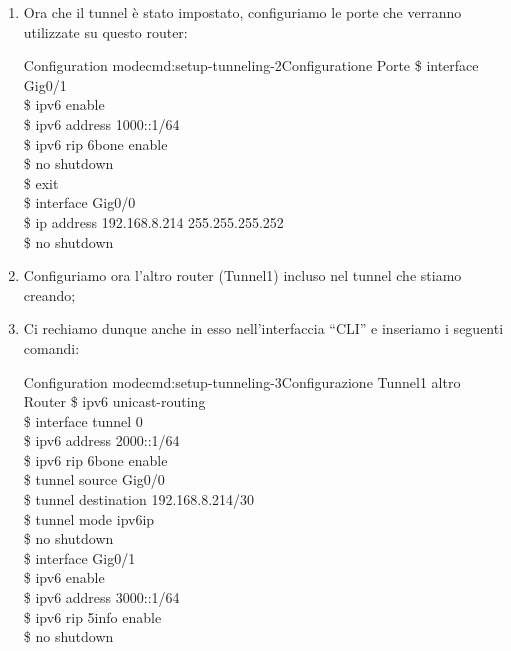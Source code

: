 \begin{enumerate}
\begin{cmds}{Configuration mode}{cmd:setup-tunneling-1}{Configurazione Tunneling}
        \$ tunnel destination 192.168.8.218/30\\
        \$ tunnel mode ipv6ip\\
        \$ no shutdown
    \end{cmds}
    \item Ora che il tunnel è stato impostato, configuriamo le porte che verranno utilizzate su questo router:\par
    \begin{cmds}{Configuration mode}{cmd:setup-tunneling-2}{Configuratione Porte}
        \$ interface Gig0/1\\
        \$ ipv6 enable\\
        \$ ipv6 address 1000::1/64\\
        \$ ipv6 rip 6bone enable\\
        \$ no shutdown\\
        \$ exit\\
        \$ interface Gig0/0\\
        \$ ip address 192.168.8.214 255.255.255.252\\
        \$ no shutdown
    \end{cmds}
    \item Configuriamo ora l’altro router (Tunnel1) incluso nel tunnel che stiamo creando;
    \item Ci rechiamo dunque anche in esso nell’interfaccia “CLI” e inseriamo i seguenti comandi:\par
    \begin{cmds}{Configuration mode}{cmd:setup-tunneling-3}{Configurazione Tunnel1 altro Router}
        \$ ipv6 unicast-routing\\
        \$ interface tunnel 0\\
        \$ ipv6 address 2000::1/64\\
        \$ ipv6 rip 6bone enable\\
        \$ tunnel source Gig0/0\\
        \$ tunnel destination 192.168.8.214/30\\
        \$ tunnel mode ipv6ip\\
        \$ no shutdown\\
        \$ interface Gig0/1\\
        \$ ipv6 enable\\
        \$ ipv6 address 3000::1/64\\
        \$ ipv6 rip 5info enable\\
        \$ no shutdown
    \end{cmds}

\end{enumerate}

